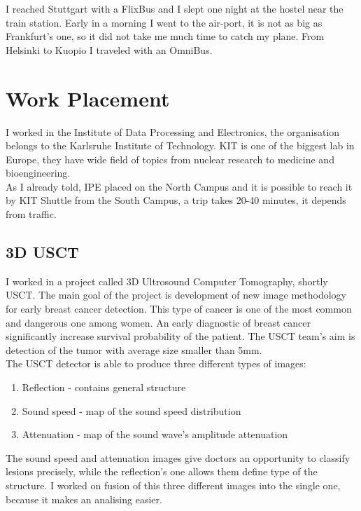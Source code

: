 \documentclass[english]{article}
\begin{document}
I reached Stuttgart with a FlixBus and I slept one night at the hostel near the train station. Early in a morning I went to the air-port, it is not as big as Frankfurt's one, so it did not take me much time to catch my plane. From Helsinki to Kuopio I traveled with an OmniBus.

\section{Work Placement}

I worked in the Institute of Data Processing and Electronics, the organisation belongs to the Karlsruhe Institute of Technology. KIT is one of the biggest lab in Europe, they have wide field of topics from nuclear research to medicine and bioengineering.\\

As I already told, IPE placed on the North Campus and it is possible to reach it by KIT Shuttle from the South Campus, a trip takes 20-40 minutes, it depends from traffic. 

\subsection{3D USCT}

I worked in a project called 3D Ultrosound Computer Tomography, shortly USCT. The main goal of the project is development of new image methodology for early breast cancer detection. This type of cancer is one of the most common and dangerous one among women. An early diagnostic of breast cancer significantly increase survival probability of the patient. The USCT team's aim is detection of the tumor with average size smaller than 5mm.\\

The USCT detector is able to produce three different types of images:

\begin{enumerate}
\item Reflection - contains general structure
\item Sound speed - map of the sound speed distribution
\item Attenuation - map of the sound wave's amplitude attenuation
\end{enumerate}

The sound speed and attenuation images give doctors an opportunity to classify lesions precisely, while the reflection's one allows them define type of the structure. I worked on fusion of this three different images into the single one, because it makes an analising easier.\\
\end{document}
